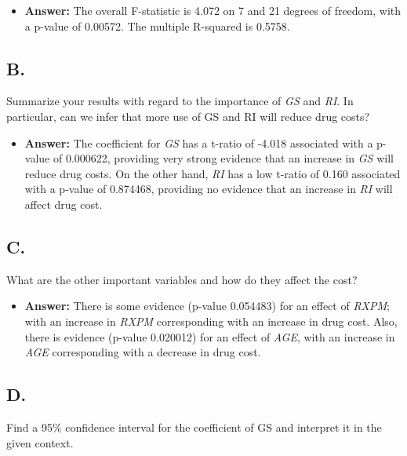 \documentclass[]{article}
\providecommand{\tightlist}{%
  \setlength{\itemsep}{0pt}\setlength{\parskip}{0pt}}
\begin{document}
\begin{itemize}
\tightlist
\item
  \textbf{Answer:} The overall F-statistic is 4.072 on 7 and 21 degrees
  of freedom, with a p-value of 0.00572. The multiple R-squared is
  0.5758.
\end{itemize}

\subsection{B.}\label{b.}

Summarize your results with regard to the importance of \emph{GS} and
\emph{RI}. In particular, can we infer that more use of GS and RI will
reduce drug costs?

\begin{itemize}
\tightlist
\item
  \textbf{Answer:} The coefficient for \emph{GS} has a t-ratio of -4.018
  associated with a p-value of 0.000622, providing very strong evidence
  that an increase in \emph{GS} will reduce drug costs. On the other
  hand, \emph{RI} has a low t-ratio of 0.160 associated with a p-value
  of 0.874468, providing no evidence that an increase in \emph{RI} will
  affect drug cost.
\end{itemize}

\subsection{C.}\label{c.}

What are the other important variables and how do they affect the cost?

\begin{itemize}
\tightlist
\item
  \textbf{Answer:} There is some evidence (p-value 0.054483) for an
  effect of \emph{RXPM}; with an increase in \emph{RXPM} corresponding
  with an increase in drug cost. Also, there is evidence (p-value
  0.020012) for an effect of \emph{AGE}, with an increase in \emph{AGE}
  corresponding with a decrease in drug cost.
\end{itemize}

\subsection{D.}\label{d.}

Find a 95\% confidence interval for the coefficient of GS and interpret
it in the given context.
\end{document}
